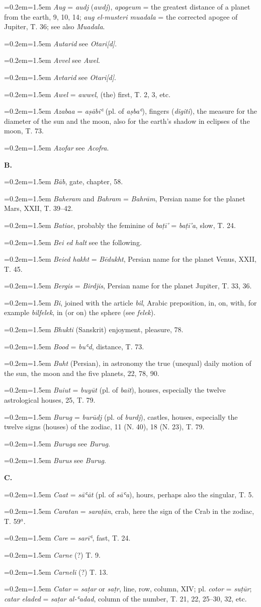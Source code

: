 \documentclass[11pt]{article}
\newcommand{\Pg}[1]{\marginpar{\footnotesize\color{gray}#1}}
\newcommand{\Entry}[1]{\par{\parskip=0.2em\relax\noindent\hangindent=1.5em\hangafter=1 #1\par}}
\begin{document}
\Entry{\emph{Aug} = \emph{audj} (\emph{awdj}), \emph{apogeum} = the greatest distance of a planet from the earth, 9, 10, 14; \emph{aug el-musteri muadala} = the corrected apogee of Jupiter, T. 36; see also \emph{Muadala}.}
\Entry{\emph{Autarid} see \emph{Otari[d]}.}
\Entry{\emph{Avvel} see \emph{Awel}.}
\Entry{\emph{Avtarid} see \emph{Otari[d]}.}
\Entry{\emph{Awel} = \emph{awwel}, (the) first, T. 2, 3, etc.}
\Entry{\emph{Azabaa} = \emph{aṣābiʿ} (pl. of \emph{aṣbaʿ}), fingers (\emph{digiti}), the measure for the diameter of the sun and the moon, also for the earth's shadow in eclipses of the moon, T. 73.}
\Entry{\emph{Azofar} see \emph{Acofra}.}
\par\begin{center}\textbf{B.}\end{center}
\Entry{\emph{Bāb}, gate, chapter, 58.}
\Entry{\emph{Baheram} and \emph{Bahram} = \emph{Bahrām}, Persian name for the planet Mars, XXII, T. 39–42.}
\Entry{\emph{Batiae}, probably the feminine of \emph{baṭī’} = \emph{baṭī’a}, slow, T. 24.}
\Entry{\emph{Bei ed halt} see the following.}
\Entry{\emph{Beied hakht} = \emph{Bēdukht}, Persian name for the planet Venus, XXII, T. 45.}
\Entry{\Pg{242}\emph{Bergis} = \emph{Birdjis}, Persian name for the planet Jupiter, T. 33, 36.}
\Entry{\emph{Bi}, joined with the article \emph{bil}, Arabic preposition, in, on, with, for example \emph{bilfelek}, in (or on) the sphere (see \emph{felek}).}
\Entry{\emph{Bhukti} (Sanskrit) enjoyment, pleasure, 78.}
\Entry{\emph{Bood} = \emph{buʿd}, distance, T. 73.}
\Entry{\emph{Buht} (Persian), in astronomy the true (unequal) daily motion of the sun, the moon and the five planets, 22, 78, 90.}
\Entry{\emph{Buiut} = \emph{buyūt} (pl. of \emph{bait}), houses, especially the twelve astrological houses, 25, T. 79.}
\Entry{\emph{Burug} = \emph{burūdj} (pl. of \emph{burdj}), castles, houses, especially the twelve signs (houses) of the zodiac, 11 (N. 40), 18 (N. 23), T. 79.}
\Entry{\emph{Buruga} see \emph{Burug}.}
\Entry{\emph{Burus} see \emph{Burug}.}
\par\begin{center}\textbf{C.}\end{center}
\Entry{\emph{Caat} = \emph{sāʿāt} (pl. of \emph{sāʿa}), hours, perhaps also the singular, T. 5.}
\Entry{\emph{Caratan} = \emph{saraṭān}, crab, here the sign of the Crab in the zodiac, T. 59$^{a}$.}
\Entry{\emph{Care} = \emph{sarīʿ}, fast, T. 24.}
\Entry{\emph{Carne} (?) T. 9.}
\Entry{\emph{Carneli} (?) T. 13.}
\Entry{\emph{Catar} = \emph{saṭar} or \emph{saṭr}, line, row, column, XIV; pl. \emph{cotor} = \emph{suṭūr}; \emph{catar eladed} = \emph{saṭar al-ʿadad}, column of the number, T. 21, 22, 25–30, 32, etc.}
\end{document}
